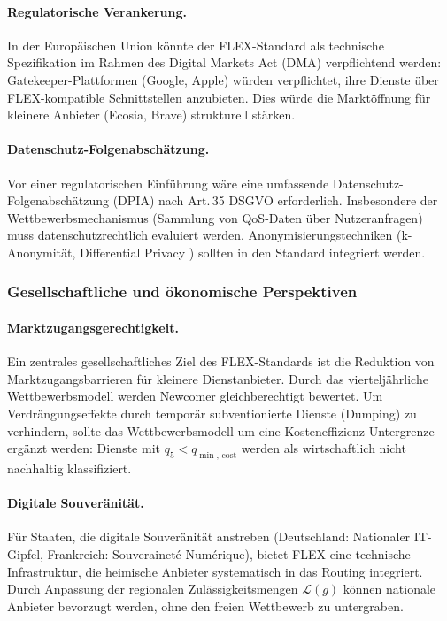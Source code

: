 ﻿\documentclass[a4paper,12pt]{article}
\theoremstyle{definition}
\begin{document}
\paragraph{Regulatorische Verankerung.}
In der Europäischen Union könnte der FLEX-Standard als technische Spezifikation im Rahmen des Digital Markets Act (DMA) verpflichtend werden: Gatekeeper-Plattformen (Google, Apple) würden verpflichtet, ihre Dienste über FLEX-kompatible Schnittstellen anzubieten. Dies würde die Marktöffnung für kleinere Anbieter (Ecosia, Brave) strukturell stärken.

\paragraph{Datenschutz-Folgenabschätzung.}
Vor einer regulatorischen Einführung wäre eine umfassende Datenschutz-Folgenabschätzung (DPIA) nach Art.\,35 DSGVO erforderlich. Insbesondere der Wettbewerbsmechanismus (Sammlung von QoS-Daten über Nutzeranfragen) muss datenschutzrechtlich evaluiert werden. Anonymisierungstechniken (k-Anonymität, Differential Privacy \cite{dwork2006}) sollten in den Standard integriert werden.

\subsubsection{Gesellschaftliche und ökonomische Perspektiven}

\paragraph{Marktzugangsgerechtigkeit.}
Ein zentrales gesellschaftliches Ziel des FLEX-Standards ist die Reduktion von Marktzugangsbarrieren für kleinere Dienstanbieter. Durch das vierteljährliche Wettbewerbsmodell werden Newcomer gleichberechtigt bewertet. Um Verdrängungs\-effekte durch temporär subventionierte Dienste (Dumping) zu verhindern, sollte das Wettbewerbsmodell um eine Kosteneffizienz-Untergrenze ergänzt werden: Dienste mit $q_5 < q_{\min,\,\mathrm{cost}}$ werden als wirtschaftlich nicht nachhaltig klassifiziert.

\paragraph{Digitale Souveränität.}
Für Staaten, die digitale Souveränität anstreben (Deutschland: Nationaler IT-Gipfel, Frankreich: Souveraineté Numérique), bietet FLEX eine technische Infrastruktur, die heimische Anbieter systematisch in das Routing integriert. Durch Anpassung der regionalen Zulässigkeitsmengen $\mathcal{L}(g)$ können nationale Anbieter bevorzugt werden, ohne den freien Wettbewerb zu untergraben.
\end{document}
